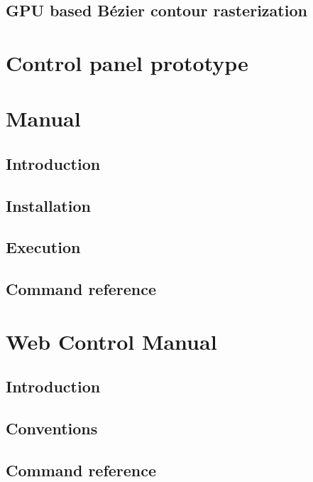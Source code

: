 \documentclass{etsist_pfg}
\begin{document}
\begin{appendices}
\begin{refsection}
\chapter{GPU based Bézier contour rasterization}

\end{refsection}

\chapter{Control panel prototype}


\chapter{Manual}
\section{Introduction}

\section{Installation}

\section{Execution}

\section{Command reference}


\chapter{Web Control Manual}
\section{Introduction}

\section{Conventions}

\section{Command reference}


\end{appendices}
\end{document}
